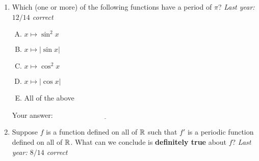 \documentclass[10pt]{amsart}
\begin{document}
\begin{enumerate}
\begin{enumerate}[(A)]
  \item $f(x) := \lbrace\begin{array}{rl} \sin(1/x), & x \ne 0\\ 0, & x = 0 \\\end{array}$
  \item $f(x) := \lbrace\begin{array}{rl} 1, & x \text{ rational} \\0, & x \text{ irrational}\\\end{array}$
  \item $f(x) := \lbrace\begin{array}{rl} x, & x \text{ rational} \\0, & x \text{ irrational}\\\end{array}$
  \item All of the above
  \item None of the above
  \end{enumerate}

  \vspace{0.1in}
  Your answer: $\underline{\qquad\qquad\qquad\qquad\qquad\qquad\qquad}$
  \vspace{1.0in}

  {\bf PLEASE TURN OVER FOR THE THIRD AND FOURTH QUESTION.}

\newpage

\item Which (one or more) of the following functions have a period of
  $\pi$? {\em Last year: $12/14$ correct}

  \begin{enumerate}[(A)]
  \item $x \mapsto \sin^2 x$
  \item $x \mapsto |\sin x|$
  \item $x \mapsto \cos^2 x$
  \item $x \mapsto |\cos x|$
  \item All of the above
  \end{enumerate}

  \vspace{0.1in}
  Your answer: $\underline{\qquad\qquad\qquad\qquad\qquad\qquad\qquad}$
  \vspace{1.5in}

\item Suppose $f$ is a function defined on all of $\mathbb{R}$ such that $f'$
  is a periodic function defined on all of $\mathbb{R}$. What can we conclude
  is {\bf definitely true} about $f$? {\em Last year: $8/14$ correct}


\end{enumerate}
\end{document}
